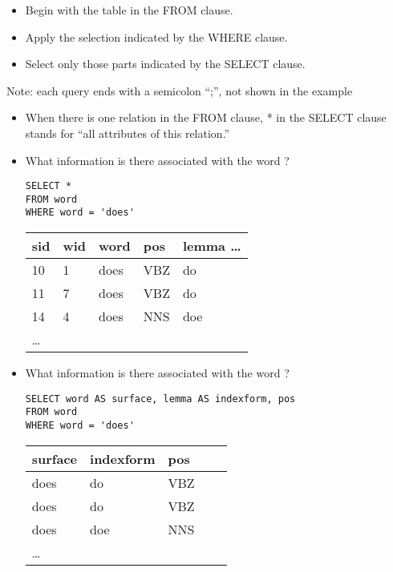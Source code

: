 \documentclass[a4paper,landscape,headrule,footrule,xetex]{foils}
\begin{document}

\begin{itemize}
\item Begin with the table in the FROM clause.
\item Apply the selection indicated by the WHERE clause.
\item Select only those parts indicated by the SELECT clause.
\end{itemize}


Note: each query ends with a semicolon ``;'', not shown in the example


\begin{itemize}
\item When there is one relation in the FROM clause, * in the SELECT clause stands for “all attributes of this relation.”
\item What information is there associated with the word ?
\begin{verbatim}
SELECT *
FROM word
WHERE word = 'does'
\end{verbatim}
  \begin{tabular}{lllll}
   \textbf{sid} & \textbf{wid} &  \textbf{word} & \textbf{pos} & \textbf{lemma} \ldots \\ \hline
    10 & 1 & does & VBZ & do \\
    11 & 7 & does & VBZ & do \\
    14 & 4 & does & NNS & doe \\
    \ldots
  \end{tabular}
\end{itemize}


\begin{itemize}
\item What information is there associated with the word ?
\begin{verbatim}
SELECT word AS surface, lemma AS indexform, pos
FROM word
WHERE word = 'does'
\end{verbatim}
  \begin{tabular}{lllll}
    \textbf{surface}  & \textbf{indexform}  &  \textbf{pos} \\ \hline
    does & do  & VBZ \\
    does & do  & VBZ \\
    does & doe & NNS \\
    \ldots
  \end{tabular}
\end{itemize}
\end{document}
